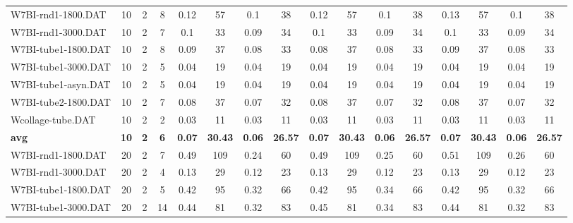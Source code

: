 \begin{sidewaystable}[!ht]
{\begin{tabular}{lccccccccccccccc}
W7BI-rnd1-1800.DAT & 10 & 2 & 8 & 0.12 & 57 &  \textcolor{blue2}{0.1} & 38 & 0.12 & 57 &  \textcolor{blue2}{0.1} & 38 & 0.13 & 57 &  \textcolor{blue2}{0.1} & 38 \\
W7BI-rnd1-3000.DAT & 10 & 2 & 7 & 0.1 & 33 &  \textcolor{blue2}{0.09} & 34 & 0.1 & 33 &  \textcolor{blue2}{0.09} & 34 & 0.1 & 33 &  \textcolor{blue2}{0.09} & 34 \\
W7BI-tube1-1800.DAT & 10 & 2 & 8 & 0.09 & 37 &  \textcolor{blue2}{0.08} & 33 &  \textcolor{blue2}{0.08} & 37 &  \textcolor{blue2}{0.08} & 33 & 0.09 & 37 &  \textcolor{blue2}{0.08} & 33 \\
W7BI-tube1-3000.DAT & 10 & 2 & 5 &  \textcolor{blue2}{0.04} & 19 &  \textcolor{blue2}{0.04} & 19 &  \textcolor{blue2}{0.04} & 19 &  \textcolor{blue2}{0.04} & 19 &  \textcolor{blue2}{0.04} & 19 &  \textcolor{blue2}{0.04} & 19 \\
W7BI-tube1-asyn.DAT & 10 & 2 & 5 &  \textcolor{blue2}{0.04} & 19 &  \textcolor{blue2}{0.04} & 19 &  \textcolor{blue2}{0.04} & 19 &  \textcolor{blue2}{0.04} & 19 &  \textcolor{blue2}{0.04} & 19 &  \textcolor{blue2}{0.04} & 19 \\
W7BI-tube2-1800.DAT & 10 & 2 & 7 & 0.08 & 37 &  \textcolor{blue2}{0.07} & 32 & 0.08 & 37 &  \textcolor{blue2}{0.07} & 32 & 0.08 & 37 &  \textcolor{blue2}{0.07} & 32 \\
Wcollage-tube.DAT & 10 & 2 & 2 &  \textcolor{blue2}{0.03} & 11 &  \textcolor{blue2}{0.03} & 11 &  \textcolor{blue2}{0.03} & 11 &  \textcolor{blue2}{0.03} & 11 &  \textcolor{blue2}{0.03} & 11 &  \textcolor{blue2}{0.03} & 11 \\
\cline{1-16} \textbf{avg} & \textbf{10} & \textbf{2} & \textbf{6} & \textbf{0.07} & \textbf{30.43} & \textbf{0.06} & \textbf{26.57} & \textbf{0.07} & \textbf{30.43} & \textbf{0.06} & \textbf{26.57} & \textbf{0.07} & \textbf{30.43} & \textbf{0.06} & \textbf{26.57} \\ \cline{1-16}
W7BI-rnd1-1800.DAT & 20 & 2 & 7 & 0.49 & 109 &  \textcolor{blue2}{0.24} & 60 & 0.49 & 109 & 0.25 & 60 & 0.51 & 109 & 0.26 & 60 \\
W7BI-rnd1-3000.DAT & 20 & 2 & 4 & 0.13 & 29 &  \textcolor{blue2}{0.12} & 23 & 0.13 & 29 &  \textcolor{blue2}{0.12} & 23 & 0.13 & 29 &  \textcolor{blue2}{0.12} & 23 \\
W7BI-tube1-1800.DAT & 20 & 2 & 5 & 0.42 & 95 &  \textcolor{blue2}{0.32} & 66 & 0.42 & 95 & 0.34 & 66 & 0.42 & 95 &  \textcolor{blue2}{0.32} & 66 \\
W7BI-tube1-3000.DAT & 20 & 2 & 14 & 0.44 & 81 &  \textcolor{blue2}{0.32} & 83 & 0.45 & 81 & 0.34 & 83 & 0.44 & 81 &  \textcolor{blue2}{0.32} & 83 \\

\end{tabular}}
\end{sidewaystable}
